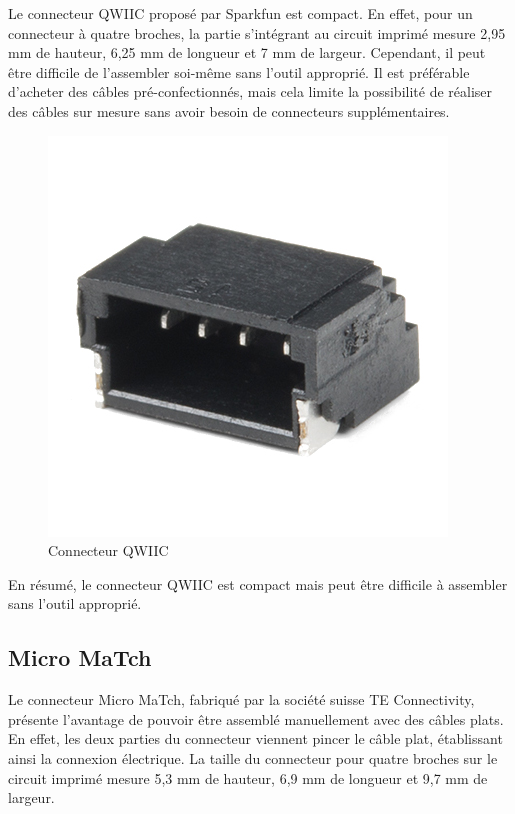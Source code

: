 Le connecteur QWIIC proposé par Sparkfun est compact.
En effet, pour un connecteur à quatre broches, la partie s'intégrant au circuit imprimé mesure 2,95 mm de hauteur, 6,25 mm de longueur et 7 mm de largeur.
Cependant, il peut être difficile de l'assembler soi-même sans l'outil approprié.
Il est préférable d'acheter des câbles pré-confectionnés, mais cela limite la possibilité de réaliser des câbles sur mesure sans avoir besoin de connecteurs supplémentaires.

\begin{figure}[H]
    \centering
    \includegraphics[scale=0.6]{./assets/figures/qwiic.jpg}
    \caption{\cite{qwiic} Connecteur QWIIC}
\end{figure}

En résumé, le connecteur QWIIC est compact mais peut être difficile à assembler sans l'outil approprié.

\subsection{Micro MaTch}

Le connecteur Micro MaTch, fabriqué par la société suisse TE Connectivity, présente l'avantage de pouvoir être assemblé manuellement avec des câbles plats.
En effet, les deux parties du connecteur viennent pincer le câble plat, établissant ainsi la connexion électrique.
La taille du connecteur pour quatre broches sur le circuit imprimé mesure 5,3 mm de hauteur, 6,9 mm de longueur et 9,7 mm de largeur.

